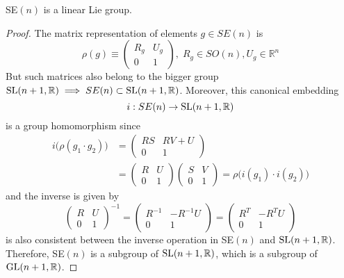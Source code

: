   \begin{proposition}
    SE$(n)$ is a linear Lie group. 
  \end{proposition}
  \begin{proof}
    The matrix representation of elements $g \in SE(n)$ is 
    \begin{equation}
      \rho(g) \equiv \begin{pmatrix}
      R_g & U_g \\ 0 & 1
      \end{pmatrix}, \; R_g \in SO(n), U_g \in \mathbb{R}^n
    \end{equation}
    But such matrices also belong to the bigger group $\SL(n+1, \mathbb{R}) \implies SE(n) \subset \SL(n+1, \mathbb{R})$. Moreover, this canonical embedding 
    \begin{equation}
      i: SE(n) \rightarrow \SL(n+1, \mathbb{R})
    \end{equation}
    is a group homomorphism since
    \begin{align*}
      i\big( \rho(g_1 \cdot g_2) \big) & = \begin{pmatrix}
      RS & RV + U \\ 0 & 1
      \end{pmatrix} \\
      & = \begin{pmatrix}
      R & U \\ 0 & 1
      \end{pmatrix} \begin{pmatrix}
      S & V \\ 0 & 1
      \end{pmatrix} = \rho \big( i(g_1) \cdot i(g_2) \big) 
    \end{align*}
    and the inverse is given by 
    \begin{equation}
      \begin{pmatrix}
      R & U \\ 0 & 1
      \end{pmatrix}^{-1} = \begin{pmatrix}
      R^{-1} & - R^{-1} U \\ 0 & 1
      \end{pmatrix} = \begin{pmatrix}
      R^T & - R^T U \\ 0 & 1
      \end{pmatrix}
    \end{equation}
    is also consistent between the inverse operation in SE$(n)$ and $\SL(n+1, \mathbb{R})$. Therefore, SE$(n)$ is a subgroup of $\SL(n+1, \mathbb{R})$, which is a subgroup of $\GL(n+1, \mathbb{R})$. 
  \end{proof}

